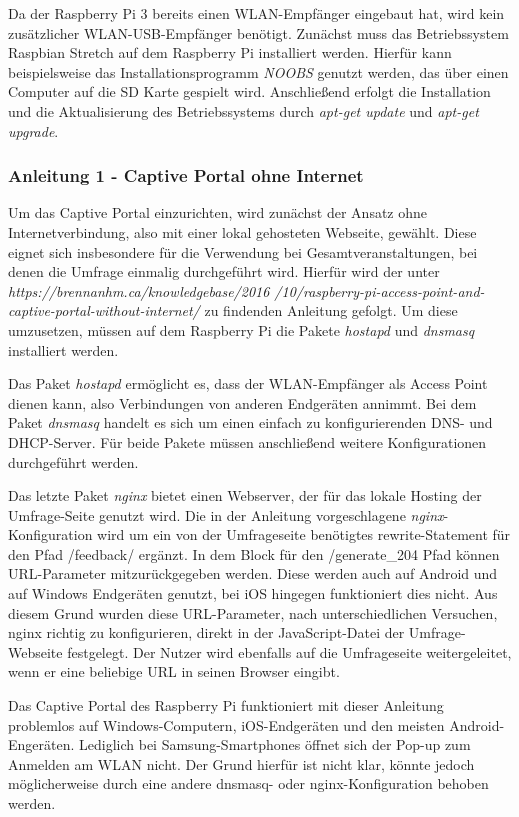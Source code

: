 Da der Raspberry Pi 3 bereits einen WLAN-Empfänger eingebaut hat, wird kein zusätzlicher WLAN-USB-Empfänger benötigt. Zunächst muss das Betriebssystem Raspbian Stretch auf dem Raspberry Pi  installiert werden. Hierfür kann beispielsweise das Installationsprogramm \textit{NOOBS} genutzt werden, das über einen Computer auf die SD Karte gespielt wird. Anschließend erfolgt die Installation und die Aktualisierung des Betriebssystems durch \textit{apt-get update} und \textit{apt-get upgrade}.

\subsubsection*{Anleitung 1 - Captive Portal ohne Internet}
Um das Captive Portal einzurichten, wird zunächst der Ansatz ohne Internetverbindung, also mit einer lokal gehosteten Webseite, gewählt. Diese eignet sich insbesondere für die Verwendung bei Gesamtveranstaltungen, bei denen die Umfrage einmalig durchgeführt wird. Hierfür wird der unter \textit{https://brennanhm.ca/knowledgebase/2016 /10/raspberry-pi-access-point-and-captive-portal-without-internet/} zu findenden Anleitung gefolgt. Um diese umzusetzen, müssen auf dem Raspberry Pi die Pakete \textit{hostapd} und \textit{dnsmasq} installiert werden.

Das Paket \textit{hostapd} ermöglicht es, dass der WLAN-Empfänger als Access Point dienen kann, also Verbindungen von anderen Endgeräten annimmt. Bei dem Paket \textit{dnsmasq} handelt es sich um einen einfach zu konfigurierenden DNS- und DHCP-Server. Für beide Pakete müssen anschließend weitere Konfigurationen durchgeführt werden.

Das letzte Paket \textit{nginx} bietet einen Webserver, der für das lokale Hosting der Umfrage-Seite genutzt wird. Die in der Anleitung vorgeschlagene \textit{nginx}-Konfiguration wird um ein von der Umfrageseite benötigtes rewrite-Statement für den Pfad /feedback/ ergänzt. In dem Block für den /generate\_204 Pfad können URL-Parameter mitzurückgegeben werden. Diese werden auch auf Android und auf Windows Endgeräten genutzt, bei iOS hingegen funktioniert dies nicht. Aus diesem Grund wurden diese URL-Parameter, nach unterschiedlichen Versuchen, nginx richtig zu konfigurieren, direkt in der JavaScript-Datei der Umfrage-Webseite festgelegt. Der Nutzer wird ebenfalls auf die Umfrageseite weitergeleitet, wenn er eine beliebige URL in seinen Browser eingibt.

Das Captive Portal des Raspberry Pi funktioniert mit dieser Anleitung problemlos auf Windows-Computern, iOS-Endgeräten und den meisten Android-Engeräten. Lediglich bei Samsung-Smartphones öffnet sich der Pop-up zum Anmelden am WLAN nicht. Der Grund hierfür ist nicht klar, könnte jedoch möglicherweise durch eine andere dnsmasq- oder nginx-Konfiguration behoben werden.


